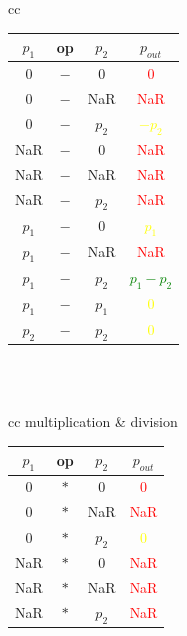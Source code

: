 \begin{table}
\begin{center}
\begin{tabular}{ cc }
\begin{tabular}{||c c c | c||}
    $p_1$ & op & $p_2$ & $p_{out}$ \\ [0.5ex]
    \hline\hline
    $0$ & $-$ & $0$ & \textcolor{red}{$0$} \\
    \hline
    $0$ & $-$ & NaR & \textcolor{red}{NaR} \\
    \hline
    $0$ & $-$ & $p_2$ & \textcolor{yellow}{$-p_2$} \\ %
    \hline
    NaR & $-$ & $0$ & \textcolor{red}{NaR} \\
    \hline
    NaR & $-$ & NaR & \textcolor{red}{NaR} \\
    \hline
    NaR & $-$ & $p_2$ & \textcolor{red}{NaR} \\
    \hline
    $p_1$ & $-$ & $0$ & \textcolor{yellow}{$p_1$} \\
    \hline
    $p_1$ & $-$ & NaR & \textcolor{red}{NaR} \\
    \hline
    $p_1$ & $-$ & $p_2$ & \textcolor{green}{$p_1 - p_2$} \\
    \hline %
    $p_1$ & $-$ & $p_1$ & \textcolor{yellow}{$0$} \\
    \hline
    $p_2$ & $-$ & $p_2$ & \textcolor{yellow}{$0$} \\
    \hline
\end{tabular}\\ \\
\end{tabular}
\end{center}
\begin{center}
\begin{tabular}{ cc }   %
multiplication & division \\
\begin{tabular}{||c c c | c||}
    \hline
    $p_1$ & op & $p_2$ & $p_{out}$ \\ [0.5ex]
    \hline\hline
    $0$ & $*$ & $0$ & \textcolor{red}{$0$} \\
    \hline
    $0$ & $*$ & NaR & \textcolor{red}{NaR} \\
    \hline
    $0$ & $*$ & $p_2$ & \textcolor{yellow}{$0$} \\ %
    \hline
    NaR & $*$ & $0$ & \textcolor{red}{NaR} \\
    \hline
    NaR & $*$ & NaR & \textcolor{red}{NaR} \\
    \hline
    NaR & $*$ & $p_2$ & \textcolor{red}{NaR} \\

\end{tabular}
\end{tabular}
\end{center}
\end{table}
